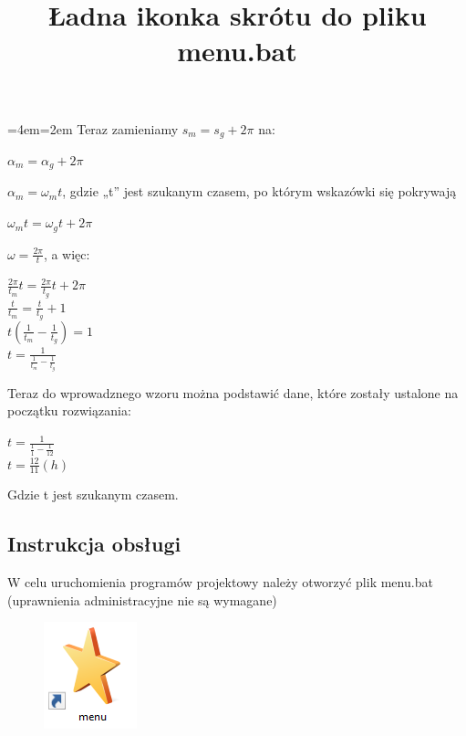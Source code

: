 \documentclass[12pt,a4paper]{article}
\newenvironment{blockquote}{%
  \par%
  \medskip
  \leftskip=4em\rightskip=2em%
  \noindent\ignorespaces}{%
  \par\medskip}
\begin{document}
            \begin{blockquote}
                Teraz zamieniamy $s_{m} = s_{g} + 2\pi$ na:
                \begin{center}
                    $\alpha_{m} = \alpha_{g} + 2\pi$
                \end{center}
                $\alpha_{m} = \omega_{m}t$, gdzie „t” jest szukanym czasem, po którym wskazówki się pokrywają
                \begin{center}
                    $\omega_{m}t = \omega_{g}t + 2\pi$
                \end{center}
                $\omega = \frac{2\pi}{t}$, a więc:
                \begin{center}
                $\frac{2\pi}{t_{m}}t = \frac{2\pi}{t_{g}}t+2\pi$ \\
                $\frac{t}{t_{m}} = \frac{t}{t_{g}}+1$ \\
                $t(\frac{1}{t_{m}}-\frac{1}{t_{g}})=1$ \\
                $t = \frac{1}{\frac{1}{t_{m}}-\frac{1}{t_{g}}}$ \\
                \end{center}
                Teraz do wprowadznego wzoru można podstawić dane, które zostały ustalone na początku rozwiązania: \\
                \begin{center}
                $t = \frac{1}{\frac{1}{1}-\frac{1}{12}}$ \\   
                $t=\frac{12}{11} (h)$
                \end{center}
                Gdzie t jest szukanym czasem.
                
            \end{blockquote}
            
            

             

            
	\subsection{Instrukcja obsługi}
	W celu uruchomienia programów projektowy należy otworzyć plik menu.bat (uprawnienia administracyjne nie są wymagane)
	
	\begin{figure}[!htb]
	    \centering
	    \includegraphics{menuicon.PNG}
	    \title{Ładna ikonka skrótu do pliku menu.bat}
	\end{figure}
	
\end{document}
